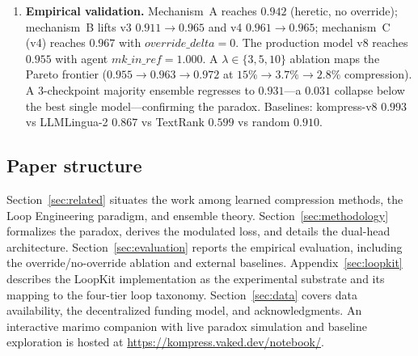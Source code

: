 \begin{enumerate}
        citation validity, and metric stability on every push. The agents
        follow a layered abstraction (\texttt{CIAgent} base class, registry,
        CLI + MCP interface) and are advisory by design---they report
        pass/fail but never block the shipping loop.
  \item \textbf{Empirical validation.} Mechanism~A reaches $0.942$ (heretic,
        no override); mechanism~B lifts v3 $0.911\to0.965$ and v4
        $0.961\to0.965$; mechanism~C (v4) reaches $0.967$ with
        $\mathit{override\_delta}{=}0$. The production model v8 reaches
        $0.955$ with agent $\mathit{mk\_in\_ref}{=}1.000$. A
        $\lambda\in\{3,5,10\}$ ablation maps the Pareto frontier
        ($0.955\to0.963\to0.972$ at $15\%\to3.7\%\to2.8\%$ compression). A
        3-checkpoint majority ensemble regresses to $0.931$---a $0.031$
        collapse below the best single model---confirming the paradox.
        Baselines: kompress-v8 $0.993$ vs LLMLingua-2 $0.867$ vs TextRank
        $0.599$ vs random $0.910$.
\end{enumerate}

\subsection{Paper structure}

Section~\ref{sec:related} situates the work among learned compression methods,
the Loop Engineering paradigm, and ensemble theory.
Section~\ref{sec:methodology} formalizes the paradox, derives the modulated
loss, and details the dual-head architecture.
Section~\ref{sec:evaluation} reports the empirical evaluation, including the
override/no-override ablation and external baselines.
Appendix~\ref{sec:loopkit} describes the LoopKit implementation as the
experimental substrate and its mapping to the four-tier loop taxonomy.
Section~\ref{sec:data} covers data availability, the decentralized funding
model, and acknowledgments. An interactive marimo companion with live paradox
simulation and baseline exploration is hosted at
\url{https://kompress.vaked.dev/notebook/}.
